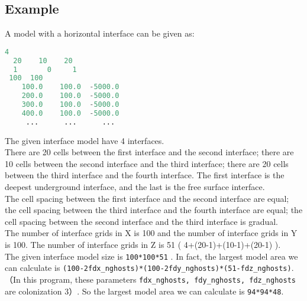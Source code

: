 \subsection{Example}

A model with a horizontal interface can be given as:

\begin{lstlisting}[language=python, title=test.gdlay, frame=tb]
  4
  20    10    20
  1       0     1    
 100  100
    100.0    100.0  -5000.0   
    200.0    100.0  -5000.0
    300.0    100.0  -5000.0
    400.0    100.0  -5000.0
     ...      ...      ... 
\end{lstlisting}
The given interface model have 4 interfaces. \\
There are 20 cells between the first interface and the second interface; there are 10 cells between the second interface and the third interface; there are 20 cells between the third interface and the fourth interface. The first interface is the deepest underground interface, and the last is the free surface interface. \\
The cell spacing between the first interface and the second interface are equal; the cell spacing between the third interface and the fourth interface are equal; the cell spacing between the second interface and the third interface is gradual.\\
The number of interface grids in X is 100 and the number of interface grids in Y is 100. The number of interface grids in Z is 51 ( 4+(20-1)+(10-1)+(20-1) ). \\

The given interface model size is \texttt{100*100*51} .
In fact, the largest model area we can calculate is \texttt{(100-2\*fdx\_nghosts)*(100-2\*fdy\_nghosts)*(51-fdz\_nghosts)}. （In this program, these parameters \texttt{fdx\_nghosts, fdy\_nghosts, fdz\_nghosts} are colonization 3）. So the largest model area we can calculate is \texttt{94*94*48}.  \\

